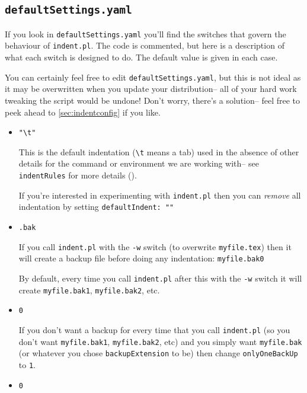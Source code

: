   
 \subsection{\lstinline!defaultSettings.yaml!}
 	If you look in \lstinline!defaultSettings.yaml! you'll find the switches 
 	that govern the behaviour of \lstinline!indent.pl!. The code is commented, 
 	but here is a description of what each switch is designed to do. The default 
 	value is given in each case.
 	 	
 	You can certainly feel free to edit \lstinline!defaultSettings.yaml!, but 
 	this is not ideal as it may be overwritten when you update your distribution--
 	all of your hard work tweaking the script would be undone! Don't worry, 
 	there's a solution-- feel free to peek ahead to \cref{sec:indentconfig} if you like.
 	\begin{itemize}
 		\item[\verbitem{defaultIndent}] \lstinline!"\t"!
 		 					
 		This is the default indentation (\lstinline!\t! means a tab) used in the absence of other details 
 		for the command or environment we are working with-- see \lstinline!indentRules!
 		for more details ().
 		 					
 		If you're interested in experimenting with \lstinline!indent.pl! then you 
 		can \emph{remove} all indentation by setting \lstinline!defaultIndent: ""!
 		\item[\verbitem{backupExtension}] \lstinline!.bak!
 		 					
 		If you call \lstinline!indent.pl! with the \lstinline!-w! switch (to overwrite
 		\lstinline!myfile.tex!) then it will create a backup file before doing 
 		any indentation: \lstinline!myfile.bak0! 
 		 					
 		By default, every time you call \lstinline!indent.pl! after this with 
 		the \lstinline!-w! switch it will create \lstinline!myfile.bak1!, \lstinline!myfile.bak2!, 
 		etc.
 		\item[\verbitem{onlyOneBackUp}] \lstinline!0!
 		 					
 		\label{page:onlyonebackup}
 		If you don't want a backup for every time that you call \lstinline!indent.pl! (so 
 		you don't want \lstinline!myfile.bak1!, \lstinline!myfile.bak2!, etc) and you simply
 		want \lstinline!myfile.bak! (or whatever you chose \lstinline!backupExtension! to be)
 		then change \lstinline!onlyOneBackUp! to \lstinline!1!.
 		\item[\verbitem{indentPreamble}] \lstinline!0!
 		 					

\end{itemize}
